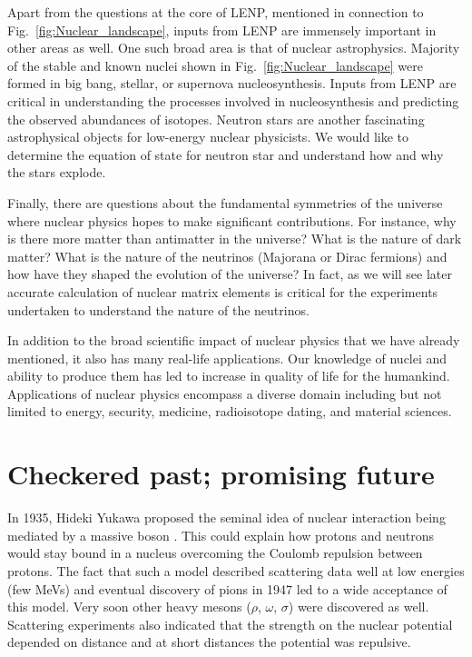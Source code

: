 	Apart from the questions at the core of LENP, mentioned in connection to
	Fig.~\ref{fig:Nuclear_landscape}, inputs from LENP are immensely important
	in other areas as well.  One such broad area is that of nuclear astrophysics.
	Majority of the stable
	and known nuclei shown in Fig.~\ref{fig:Nuclear_landscape} were formed in
	big bang, stellar, or supernova nucleosynthesis.  Inputs from LENP are
	critical in understanding the processes involved in nucleosynthesis and
	predicting the observed abundances of isotopes.
	Neutron stars are another fascinating astrophysical objects for low-energy
	nuclear physicists.  We would like to determine the equation of state for
	neutron star and understand how and why the stars explode.

	Finally, there are questions about the fundamental symmetries of the universe
	where
	nuclear physics hopes to make significant contributions.  For instance,
	why is there more matter than antimatter in the universe?  What is the nature
	of dark matter?  What is the nature of the neutrinos (Majorana or Dirac
	fermions) and how have they shaped the evolution of the universe?
	In fact, as we will see later accurate calculation of nuclear matrix elements
	is critical for the experiments undertaken to understand the nature of the
	neutrinos.

	In addition to the broad scientific impact of nuclear physics that we have
	already mentioned, it also has many real-life applications.  Our knowledge of
	nuclei and ability to produce them has led to increase in quality of life
	for the humankind.  Applications of nuclear physics encompass a diverse
	domain including but not limited to energy, security, medicine,
	radioisotope dating, and material sciences.


	\section{Checkered past; promising future}

	In 1935, Hideki Yukawa proposed the seminal idea of nuclear interaction
	being mediated by a massive boson \cite{Yukawa:1935xg}.   This could explain
	how protons and neutrons would stay bound in a nucleus overcoming the Coulomb
	repulsion between protons.  The fact that such a model described scattering
	data well at low energies (few MeVs) and eventual discovery of pions in 1947
	led to a wide acceptance of this model.  Very soon other heavy mesons
	($\rho$, $\omega$, $\sigma$) were discovered as well.  Scattering experiments
	also indicated that the strength on the nuclear potential depended on
	distance and at short distances the potential was repulsive.

